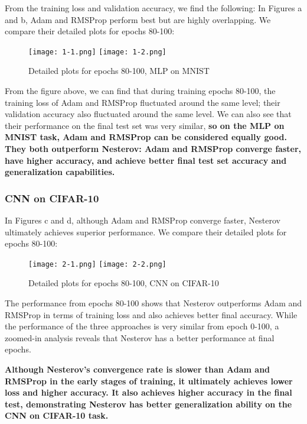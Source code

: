 \documentclass[12pt]{article}
\begin{document}
From the training loss and validation accuracy, we find the following:
In Figures a and b, Adam and RMSProp perform best but are highly overlapping. We compare their detailed plots for epochs 80-100:


\begin{figure}[H]
    \centering
    \texttt{[image: 1-1.png]}
    \texttt{[image: 1-2.png]}
    \caption{Detailed plots for epochs 80-100, MLP on MNIST}
    \label{fig:detailed_mlp_on_mnist}
\end{figure}

From the figure above, we can find that during training epochs 80-100, the training loss of Adam and RMSProp fluctuated around the same level; their validation accuracy also fluctuated around the same level. We can also see that their performance on the final test set was very similar, \textbf{so on the MLP on MNIST task, Adam and RMSProp can be considered equally good. They both outperform Nesterov: Adam and RMSProp converge faster, have higher accuracy, and achieve better final test set accuracy and generalization capabilities.}


\subsubsection{CNN on CIFAR-10}

In Figures c and d, although Adam and RMSProp converge faster, Nesterov ultimately achieves superior performance. We compare their detailed plots for epochs 80-100:

\begin{figure}[H]
    \centering
    \texttt{[image: 2-1.png]}
    \texttt{[image: 2-2.png]}
    \caption{Detailed plots for epochs 80-100, CNN on CIFAR-10}
    \label{fig:detailed_cnn_on_cifar10}
\end{figure}

The performance from epochs 80-100 shows that Nesterov outperforms Adam and RMSProp in terms of training loss and also achieves better final accuracy. While the performance of the three approaches is very similar from epoch 0-100, a zoomed-in analysis reveals that Nesterov has a better performance at final epochs.

\textbf{Although Nesterov's convergence rate is slower than Adam and RMSProp in the early stages of training, it ultimately achieves lower loss and higher accuracy. It also achieves higher accuracy in the final test, demonstrating Nesterov has better generalization ability on the CNN on CIFAR-10 task.}
\end{document}
